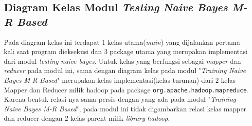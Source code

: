 \subsection{Diagram Kelas Modul \textit{Testing Naive Bayes M-R Based}}
Pada diagram kelas ini terdapat 1 kelas utama(\textit{main}) yang dijalankan pertama kali saat program dieksekusi dan 3 package utama yang merupakan implementasi dari modul \textit{testing naive bayes}. Untuk kelas yang berfungsi sebagai \textit{mapper} dan \textit{reducer} pada modul ini, sama dengan diagram kelas pada modul "\textit{Training Naive Bayes M-R Based}" merupakan kelas implementasi(kelas turunan) dari 2 kelas Mapper dan Reducer milik hadoop pada package \verb|org.apache.hadoop.mapreduce|. Karena bentuk relasi-nya sama persis dengan yang ada pada modul "\textit{Training Naive Bayes M-R Based}", pada modul ini tidak digambarkan relasi kelas mapper dan reducer dengan 2 kelas parent milik \textit{library hadoop}.

